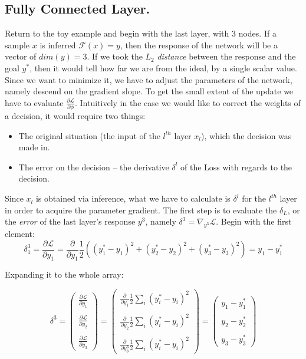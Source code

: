 \subsection{Fully Connected Layer.}
Return to the toy example and begin with the last layer, with $3$ nodes. If a sample $x$ is inferred $\mathcal{F}(x)=y$, then the response of the network will be a vector of $dim(y) = 3$. If we took the $L_2$ \emph{distance} between the response and the goal $y^*$, then it would tell how far we are from the ideal, by a single scalar value. Since we want to minimize it, we have to adjust the parameters of the network, namely descend on the gradient slope. To get the small extent of the update we have to evaluate $\frac{\partial\mathcal{L}}{\partial \phi}$. 
Intuitively in the case we would like to correct the weights of a decision, it would require two things:
\begin{itemize}
    \item[] The original situation (the input of the $l^{th}$ layer $x_l$), which the decision was made in.
    \item[] The error on the decision -- the derivative $\delta^l$ of the Loss with regards to the decision.
\end{itemize}
Since $x_l$ is obtained via inference, what we have to calculate is $\delta^l$ for the $l^{th}$ layer in order to acquire the parameter gradient.
The first step is to evaluate the $\delta_L$, or the \emph{error} of the last layer's response $y^3$, namely $\delta^3 = \nabla_{y^3} \mathcal{L}$.
Begin with the first element: 
$$
    \delta_1^3 = 
    \frac{\partial \mathcal{L}}{\partial y_1} = 
    \frac{\partial}{\partial y_1}\frac{1}{2}\left((y^*_1 - y_1)^2 + (y^*_2 - y_2)^2 + (y^*_3 - y_3)^2\right) = y_1 - y^*_1
$$
\begin{center}
Expanding it to the whole array:
\end{center}
$$
    \delta^3 = \begin{pmatrix}
     \frac{\partial \mathcal{L}}{\partial y_1}\\ \\
    \frac{\partial \mathcal{L}}{\partial y_2} \\ \\
    \frac{\partial \mathcal{L}}{\partial y_3}
    \end{pmatrix} = \begin{pmatrix}
     \frac{\partial}{\partial y_1} \frac{1}{2}\sum_i(y_i^*-y_i)^2\\ \\
    \frac{\partial}{\partial y_2} \frac{1}{2}\sum_i(y_i^*-y_i)^2 \\ \\
    \frac{\partial}{\partial y^3_3}  \frac{1}{2}\sum_i(y_i^*-y_i)^2
    \end{pmatrix} = \begin{pmatrix}
     {y_1-y^*_1}\\ \\
     {y_2-y^*_2}\\ \\
     {y_3-y^*_3}
    \end{pmatrix} 
$$
